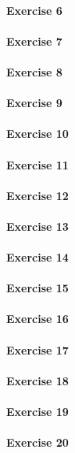 \paragraph{Exercise 6}
\paragraph{Exercise 7}
\paragraph{Exercise 8}
\paragraph{Exercise 9}
\paragraph{Exercise 10}
\paragraph{Exercise 11}
\paragraph{Exercise 12}
\paragraph{Exercise 13}
\paragraph{Exercise 14}
\paragraph{Exercise 15}
\paragraph{Exercise 16}
\paragraph{Exercise 17}
\paragraph{Exercise 18}
\paragraph{Exercise 19}
\paragraph{Exercise 20}
